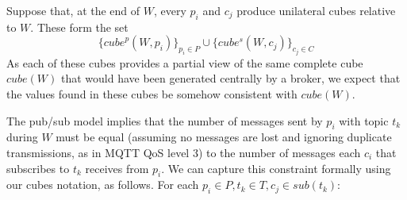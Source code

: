 \documentclass[chi_draft]{sigchi}
\begin{document}
Suppose that, at the end of $W$, every $p_i$ and $c_j$ produce  unilateral cubes relative to $W$. 
These form the set
\begin{equation}\label{eq:all-cubes}
\{ \mathit{cube}^p(W, p_i) \}_{p_i \in P}\cup \{\mathit{cube^s}(W, c_j) \}_{c_j \in C} 
\end{equation}
As each of these cubes provides a partial view of the same complete cube $ \mathit{cube}(W) $ that would have been generated centrally by a broker, we expect that the values found in these cubes be somehow consistent with $ \mathit{cube}(W) $.

The pub/sub model implies that the number of messages sent by $p_i$ with topic $t_k$ during $W$ must be equal (assuming no messages are lost and ignoring duplicate transmissions, as in MQTT QoS level 3) to the number of messages each $c_i$ that subscribes to $t_k$ receives from $p_i$. 
We can capture this constraint formally using our cubes notation, as follows.
%
For each $ p_i \in P, t_k \in T, c_j \in \mathit{sub}(t_k)$:
\end{document}
